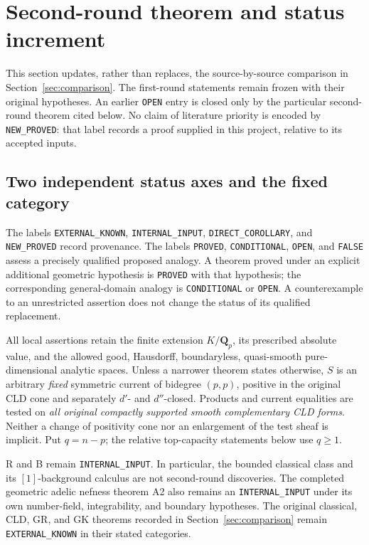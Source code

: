\documentclass[11pt,a4paper]{article}
\numberwithin{equation}{section}
\theoremstyle{definition}
\theoremstyle{remark}
\begin{document}


\section{Second-round theorem and status increment}
\label{sec:r2-status}

This section updates, rather than replaces, the source-by-source comparison
in Section~\ref{sec:comparison}. The first-round statements remain frozen
with their original hypotheses. An earlier \texttt{OPEN} entry is closed
only by the particular second-round theorem cited below. No claim of
literature priority is encoded by \texttt{NEW\_PROVED}: that label records
a proof supplied in this project, relative to its accepted inputs.

\subsection{Two independent status axes and the fixed category}

The labels \texttt{EXTERNAL\_KNOWN}, \texttt{INTERNAL\_INPUT},
\texttt{DIRECT\_COROLLARY}, and \texttt{NEW\_PROVED} record provenance.
The labels \texttt{PROVED}, \texttt{CONDITIONAL}, \texttt{OPEN}, and
\texttt{FALSE} assess a precisely qualified proposed analogy. A theorem
proved under an explicit additional geometric hypothesis is
\texttt{PROVED} with that hypothesis; the corresponding general-domain
analogy is \texttt{CONDITIONAL} or \texttt{OPEN}. A counterexample to an
unrestricted assertion does not change the status of its qualified
replacement.

All local assertions retain the finite extension $K/\mathbf Q_p$, its
prescribed absolute value, and the allowed good, Hausdorff, boundaryless,
quasi-smooth pure-dimensional analytic spaces. Unless a narrower theorem
states otherwise, $S$ is an arbitrary \emph{fixed} symmetric current of
bidegree $(p,p)$, positive in the original CLD cone and separately
$d'$- and $d''$-closed. Products and current equalities are tested on
\emph{all original compactly supported smooth complementary CLD forms}.
Neither a change of positivity cone nor an enlargement of the test sheaf
is implicit. Put $q=n-p$; the relative top-capacity statements below use
$q\geq1$.

R and B remain \texttt{INTERNAL\_INPUT}. In particular, the bounded
classical class and its $[1]$-background calculus are not second-round
discoveries. The completed geometric adelic nefness theorem A2 also
remains an \texttt{INTERNAL\_INPUT} under its own number-field,
integrability, and boundary hypotheses. The original classical, CLD,
GR, and GK theorems recorded in Section~\ref{sec:comparison} remain
\texttt{EXTERNAL\_KNOWN} in their stated categories.
\end{document}
